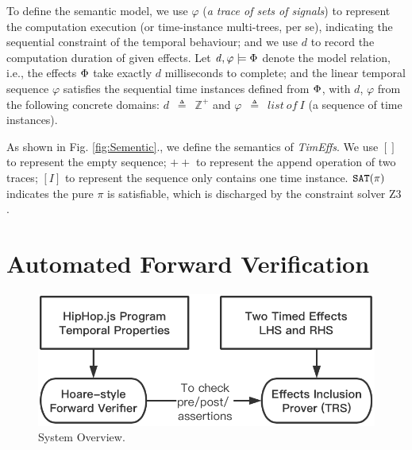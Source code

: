 \documentclass[acmsmall,10pt,review]{acmart}
\newcommand{\timedEffects}{\emph{TimEffs}}
\newcommand{\effect}{\textcolor{black}{\ensuremath{\mathrm{\Phi}}}}
\newcommand{\code}[1]{{\tt{\ensuremath{\m{#1}}}}}
\newcommand{\m}{\mathit}
\def\defeq{\ensuremath{\,\triangleq}}
\newcommand\figref[1]{Fig. \textcolor{black}{\ref{#1}}.}
\begin{document}
{To define the semantic model, 
we use \code{\varphi} (\emph{a trace of sets of signals})  to represent the computation execution (or time-instance multi-trees, per se), indicating the sequential constraint of the temporal behaviour; and we use \code{d} to record the computation duration of given effects. 
Let \code{d, \varphi \models \effect} denote the model relation, i.e., 
the effects \code{\effect} take exactly \code{d} milliseconds to complete; and 
the linear temporal sequence \code{\varphi} satisfies the sequential time  instances defined from \code{\effect}, with \code{d}, \code{\varphi} from the following concrete domains: \code{d}  {\defeq}\  \code{\mathbb{Z^+}} and \code{\varphi}   {\defeq}\ \code{list\ of\ I} (a sequence of time instances).


As shown in \figref{fig:Sementic}, we define the semantics of \timedEffects. 
We use 
$[]$ to represent the empty sequence;
${+}{+}$ to represent the append operation of two traces;
\code{[I]} to represent the sequence only contains one time instance.
\code{{\tt{SAT}(\pi)} } indicates the pure \code{\pi} is satisfiable, which is discharged by the constraint solver Z3 \cite{de2008z3}.  






\section{Automated Forward Verification}\label{sec:Verification}




\begin{figure}
    \vspace{-3mm}
\centering
\includegraphics[width=0.5\columnwidth]{verification.png}
        \vspace{-3mm}
\caption{\label{fig:Verification_oberview}System Overview.}
      \vspace{-1mm}
\end{figure}

}
\end{document}
